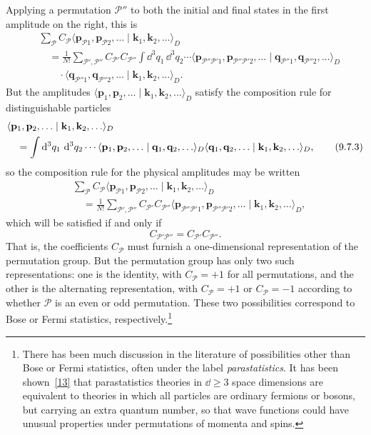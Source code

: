Applying a permutation $\mathcal P''$ to both the initial and final states in
the first amplitude on the right, this is
\begin{align*}
&\sum_{\mathcal P}C_{\mathcal P}
 \langle\mathbf p_{\mathcal P1},\mathbf p_{\mathcal P2},\ldots\mid
 \mathbf k_1,\mathbf k_2,\ldots\rangle_D
\\
&\quad=\frac{1}{N!}\sum_{\mathcal P',\mathcal P''}
 C_{\mathcal P'}C_{\mathcal P''}\int \dd^3q_1\,\dd^3q_2\cdots
 \langle\mathbf p_{\mathcal P''\mathcal P'1},
 \mathbf p_{\mathcal P''\mathcal P'2},\ldots\mid
 \mathbf q_{\mathcal P''1},\mathbf q_{\mathcal P''2},\ldots\rangle_D
\\
&\qquad\cdot
 \langle\mathbf q_{\mathcal P''1},\mathbf q_{\mathcal P''2},\ldots\mid
 \mathbf k_1,\mathbf k_2,\ldots\rangle_D.
\end{align*}
But the amplitudes
$\langle\mathbf p_1,\mathbf p_2,\ldots\mid
\mathbf k_1,\mathbf k_2,\ldots\rangle_D$ satisfy the composition rule for
distinguishable particles
\begin{align}
&\langle\mathbf p_1,\mathbf p_2,\ldots\mid
 \mathbf k_1,\mathbf k_2,\ldots\rangle_D
\notag\\
&\quad=\int \mathop{}\!\mathrm{d}^3q_1\,\mathop{}\!\mathrm{d}^3q_2\cdots
 \langle\mathbf p_1,\mathbf p_2,\ldots\mid
 \mathbf q_1,\mathbf q_2,\ldots\rangle_D
 \langle\mathbf q_1,\mathbf q_2,\ldots\mid
 \mathbf k_1,\mathbf k_2,\ldots\rangle_D,
\tag{9.7.3}\label{eq:9.7.3}
\end{align}
so the composition rule for the physical amplitudes may be written
\begin{align*}
&\sum_{\mathcal P}C_{\mathcal P}
 \langle\mathbf p_{\mathcal P1},\mathbf p_{\mathcal P2},\ldots\mid
 \mathbf k_1,\mathbf k_2,\ldots\rangle_D
\\
&\quad=\frac{1}{N!}\sum_{\mathcal P',\mathcal P''}
 C_{\mathcal P'}C_{\mathcal P''}
 \langle\mathbf p_{\mathcal P''\mathcal P'1},
 \mathbf p_{\mathcal P''\mathcal P'2},\ldots\mid
 \mathbf k_1,\mathbf k_2,\ldots\rangle_D,
\end{align*}
which will be satisfied if and only if
\begin{equation}
C_{\mathcal P'\mathcal P''}=C_{\mathcal P'}C_{\mathcal P''}.
\tag{9.7.4}\label{eq:9.7.4}
\end{equation}
That is, the coefficients $C_{\mathcal P}$ must furnish a one-dimensional
representation of the permutation group. But the permutation group has only
two such representations: one is the identity, with $C_{\mathcal P}=+1$ for
all permutations, and the other is the alternating representation, with
$C_{\mathcal P}=+1$ or $C_{\mathcal P}=-1$ according to whether $\mathcal P$ is
an even or odd permutation. These two possibilities correspond to Bose or
Fermi statistics, respectively.\footnote{There has been much discussion in the
literature of possibilities other than Bose or Fermi statistics, often under
the label \emph{parastatistics}. It has been shown~\hyperref[ref:9.13]{[13]} that parastatistics
theories in $\dd\geq3$ space dimensions are equivalent to theories in which all
particles are ordinary fermions or bosons, but carrying an extra quantum
number, so that wave functions could have unusual properties under
permutations of momenta and spins.}

